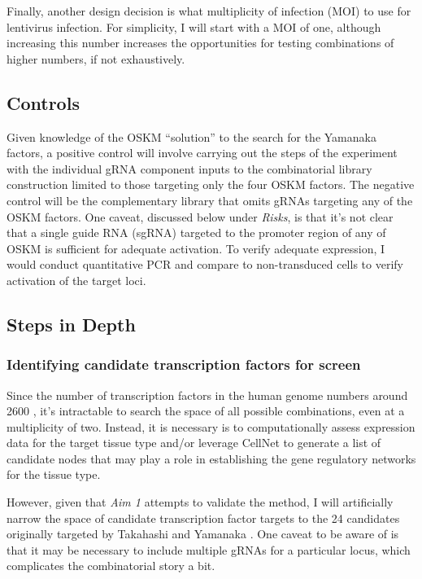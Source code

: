 \documentclass[10pt]{article}
\begin{document}
Finally, another design decision is what multiplicity of infection (MOI) to use for lentivirus infection. For simplicity, I will start with a MOI of one, although increasing this number increases the opportunities for testing combinations of higher numbers, if not exhaustively.

\subsection{Controls}

Given knowledge of the OSKM ``solution'' to the search for the Yamanaka factors, a positive control will involve carrying out the steps of the experiment with the individual gRNA component inputs to the combinatorial library construction limited to those targeting only the four OSKM factors. The negative control will be the complementary library that omits gRNAs targeting any of the OSKM factors. One caveat, discussed below under \textit{Risks}, is that it's not clear that a single guide RNA (sgRNA) targeted to the promoter region of any of OSKM is sufficient for adequate activation. To verify adequate expression, I would conduct quantitative PCR and compare to non-transduced cells to verify activation of the target loci.

\subsection{Steps in Depth}

\subsubsection{Identifying candidate transcription factors for screen}

Since the number of transcription factors in the human genome numbers around 2600 \cite{babu2004structure}, it's intractable to search the space of all possible combinations, even at a multiplicity of two. Instead, it is necessary is to computationally assess expression data for the target tissue type and/or leverage CellNet \cite{cahan2014cellnet} to generate a list of candidate nodes that may play a role in establishing the gene regulatory networks for the tissue type.

However, given that \textit{Aim 1} attempts to validate the method, I will artificially narrow the space of candidate transcription factor targets to the 24 candidates originally targeted by Takahashi and Yamanaka \cite{takahashi2006induction}. One caveat to be aware of is that it may be necessary to include multiple gRNAs for a particular locus, which complicates the combinatorial story a bit.
\end{document}
